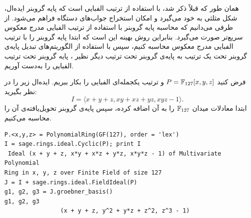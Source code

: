 \begin{remark}
	همان طور که قبلاً ذکر شد، با استفاده از ترتیب الفبایی است که پایه‌  گروبنر  ایده‌ال، شکل مثلثی به خود می‌گیرد و  امکان استخراج جواب‌های دستگاه فراهم می‌شود. از طرفی می‌دانیم که محاسبه پایه‌  گروبنر با استفاده از ترتیب الفبایی مدرج معکوس سریع‌تر صورت می‌گیرد. بنابراین روش بهینه این است که ابتدا پایه‌  گروبنر را با ترتیب الفبایی مدرج معکوس محاسبه کنیم، سپس با استفاده از الگوریتم‌های تبدیل پایه‌ی گروبنر تحت یک ترتیب به پایه‌ی گروبنر تحت ترتیب دیگر نظیر 
	\cite{faugere1993efficient}
	،
	پایه‌  گروبنر تحت ترتیب الفبایی را به‌دست  آوریم.
\end{remark}
\begin{example}
	فرض کنید 
	$P = \mathbb{F}_{127}[x,y,z]$
	و ترتیب یکجمله‌ای الفبایی را بکار ببریم. ایده‌ال زیر را در نظر بگیرید:
	$$I = \langle x + y + z, xy + xz + yz, xyz - 1 \rangle.$$
	ابتدا معادلات میدان 
	$\mathbb{F}_{127}$
	را به آن اضافه کرده، سپس پایه‌ی گروبنر تحویل‌یافته‌ی  آن را محاسبه می‌کنیم.
\begin{latin}
\begin{flushleft}
\begin{lstlisting}
P.<x,y,z> = PolynomialRing(GF(127), order = 'lex')
I = sage.rings.ideal.Cyclic(P); print I
 Ideal (x + y + z, x*y + x*z + y*z, x*y*z - 1) of Multivariate Polynomial
Ring in x, y, z over Finite Field of size 127
J = I + sage.rings.ideal.FieldIdeal(P)
g1, g2, g3 = J.groebner_basis()
g1, g2, g3
                (x + y + z, y^2 + y*z + z^2, z^3 - 1)
\end{lstlisting}
\end{flushleft}
\end{latin}	


\end{example}
